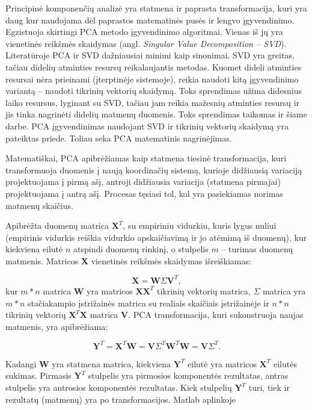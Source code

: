 \documentclass[]{vgtuef}
\begin{document}
Principinė komponenčių analizė \cite{citeulike:2695782} yra statmena ir paprasta transformacija, kuri yra daug kur naudojama dėl paprastos matematinės pusės ir lengvo įgyvendinimo. Egzistuoja skirtingi PCA metodo įgyvendinimo algoritmai. Vienas iš jų yra vienetinės reikšmės skaidymas (angl. \textit{Singular Value Decomposition -- SVD}). Literatūroje PCA ir SVD dažniausiai minimi kaip sinonimai. SVD yra greitas, tačiau didelių atminties resursų reikalaujantis metodas. Kuomet dideli atminties resursai nėra prieinami (įterptinėje sistemoje), reikia naudoti kitą įgyvendinimo variantą -- naudoti tikrinių vektorių skaidymą. Toks sprendimas užima didesnius laiko resursus, lyginant su SVD, tačiau jam reikia mažesnių atminties resursų ir jis tinka nagrinėti didelių matmenų duomenis. Toks sprendimas taikomas ir šiame darbe. PCA įgyvendinimas naudojant SVD ir tikrinių vektorių skaidymą yra pateiktas priede. Toliau seka PCA matematinis nagrinėjimas.

Matematiškai, PCA apibrėžiamas kaip statmena tiesinė transformacija, kuri transformuoja duomenis į naują koordinačių sistemą, kurioje didžiausią variaciją projektuojama į pirmą ašį, antroji didžiausia variacija (statmena pirmajai) projektuojama į antrą ašį. Procesas tęsiasi tol, kol yra pasiekiamas norimas matmenų skaičius.

Apibrėžta duomenų matrica $\textbf{X}^T$, su empiriniu vidurkiu, kuris lygus nuliui (empirinis vidurkis reiškia vidurkio apskaičiavimą ir jo atėmimą iš duomenų), kur kiekviena eilutė $n$ atspindi duomenų rinkinį, o stulpelis $m$ -- turimas duomenų matmenis. Matricos $\textbf{X}$ vienetinės reikšmės skaidymas išreiškiamas:

\begin{equation}
  \mathbf{X} = \mathbf{W} \Sigma \mathbf{V}^T,
\end{equation}
kur $m*n$ matrica $\mathbf{W}$ yra matricos $\textbf{XX}^T$ tikrinių vektorių matrica, $\Sigma$ matrica yra $m*n$ stačiakampio įstrižainės matrica su realiais skaičiais įstrižainėje ir $n*n$ tikrinių vektorių $\mathbf{X}^T\mathbf{X}$ matrica $\mathbf{V}$. PCA transformacija, kuri sukonstruoja naujas matmenis, yra apibrėžiama:

\begin{equation}
  \mathbf{Y}^T = \mathbf{X}^T \mathbf{W} = \mathbf{V} \Sigma^T
  \mathbf{W}^T \mathbf{W} = \mathbf{V} \Sigma^T .
\end{equation}

Kadangi $\textbf{W}$ yra statmena matrica, kiekviena $\textbf{Y}^T$ eilutė yra matricos $\textbf{X}^T$ eilutės sukimas. Pirmasis $\textbf{Y}^T$ stulpelis yra pirmosios komponentės rezultatas, antras stulpelis yra antrosios komponentės rezultatas. Kiek stulpelių $\textbf{Y}^T$ turi, tiek ir rezultatų (matmenų) yra po transformacijos. Matlab aplinkoje 
\end{document}
